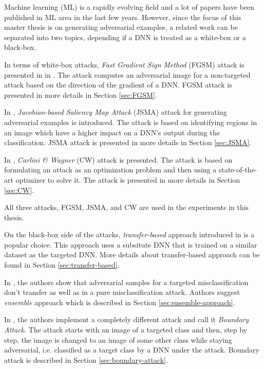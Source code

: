 Machine learning (ML) is a rapidly evolving field and a lot of papers have been published in ML area in the last few years. However, since the focus of this master thesis is on generating adversarial examples, a related work can be separated into two topics, depending if a DNN is treated as a white-box or a black-box. 

In terms of white-box attacks, \textit{Fast Gradient Sign Method} (FGSM) attack is presented in  in \cite{fgsm-original}. The attack computes an adversarial image for a non-targeted attack based on the direction of the gradient of a DNN. FGSM attack is presented in more details in Section \ref{sec:FGSM}.

In \cite{DBLP:journals/corr/PapernotMJFCS15}, \textit{Jacobian-based Saliency Map Attack} (JSMA) attack for generating adversarial examples is introduced. The attack is based on identifying regions in an image which have a higher impact on a DNN's output during the classification. JSMA attack is presented in more details in  Section \ref{sec:JSMA}.

In \cite{DBLP:journals/corr/CarliniW16a}, \textit{Carlini \& Wagner} (CW) attack is presented. The attack is based on formulating an attack as an optimization problem and then using a state-of-the-art optimizer to solve it. The attack is presented in more details in Section \ref{sec:CW}.

All three attacks, FGSM, JSMA, and CW are used in the experiments in this thesis.

On the black-box side of the attacks, \textit{transfer-based} approach introduced in \cite{DBLP:journals/corr/PapernotMGJCS16} is a popular choice. This approach uses a subsitute DNN that is trained on a similar dataset as the targeted DNN. More details about transfer-based approach can be found in Section \ref{sec:transfer-based}.

In \cite{ensemble-attack}, the authors show that adversarial samples for a targeted misclassification don't transfer as well as in a pure misclassification attack. Authors suggest \textit{ensemble} approach which is described in Section \ref{sec:ensemble-approach}.

In \cite{brendel2018decisionbased}, the authors implement a completely different attack and call it \textit{Boundary Attack}. The attack starts with an image of a targeted class and then, step by step, the image is changed to an image of some other class while staying adversarial, i.e. classified as a target class by a DNN under the attack. Boundary attack is described in Section \ref{sec:boundary-attack}.

